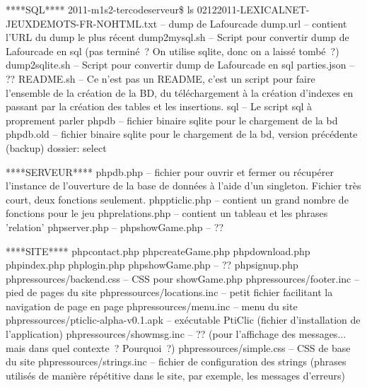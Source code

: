 \documentclass[a4paper,11pt,french]{article}
\begin{document}

****SQL****
2011-m1s2-ter\/code\/serveur\$ ls
02122011-LEXICALNET-JEUXDEMOTS-FR-NOHTML.txt  -- dump de Lafourcade
dump.url -- contient l'URL du dump le plus récent
dump2mysql.sh -- Script pour convertir dump de Lafourcade en sql (pas terminé~? On utilise sqlite, donc on a laissé tombé~?)
dump2sqlite.sh  -- Script pour convertir dump de Lafourcade en sql
parties.json  -- ??
README.sh -- Ce n'est pas un README, c'est un script pour faire l'ensemble de la création de la BD, du téléchargement à la création d'indexes en passant par la création des tables et les insertions.
sql -- Le script sql à proprement parler
php\/db -- fichier binaire sqlite pour le chargement de la bd
php\/db.old -- fichier binaire sqlite pour le chargement de la bd, version précédente (backup)
dossier: select

****SERVEUR****
php\/db.php -- fichier pour ouvrir et fermer ou récupérer l'instance de l'ouverture de la base de données à l'aide d'un singleton. 
		Fichier très court, deux fonctions seulement.
php\/pticlic.php -- contient un grand nombre de fonctions pour le jeu
php\/relations.php -- contient un tableau et les phrases 'relation'
php\/server.php --
php\/showGame.php -- ??



****SITE****
php\/contact.php
php\/createGame.php
php\/download.php
php\/index.php
php\/login.php
php\/showGame.php -- ??
php\/signup.php
php\/ressources/backend.css  -- CSS pour showGame.php
php\/ressources/footer.inc  -- pied de pages du site
php\/ressources/locations.inc  -- petit fichier facilitant la navigation de page en page
php\/ressources/menu.inc  -- menu du site
php\/ressources/pticlic-alpha-v0.1.apk  -- exécutable PtiClic (fichier d'installation de l'application)
php\/ressources/showmsg.inc  -- ?? (pour l'affichage des messages... mais dans quel contexte~? Pourquoi~?)
php\/ressources/simple.css  -- CSS de base du site
php\/ressources/strings.inc -- fichier de configuration des strings (phrases utilisés de manière répétitive dans le site, par exemple, les messages d'erreurs)
\end{document}
